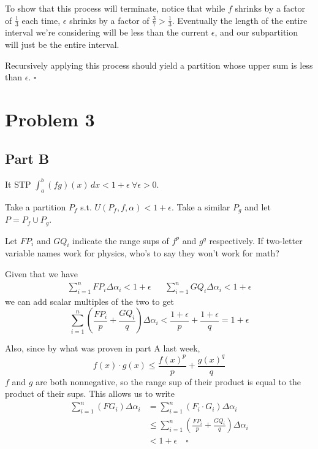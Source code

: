 \documentclass[12pt]{article}
\begin{document}
To show that this process will terminate, notice that while $f$ shrinks by a factor of $\frac{1}{3}$ each time,
$\epsilon$ shrinks by a factor of $\frac{3}{7} > \frac{1}{3}$.
Eventually the length of the entire interval we're considering will be less than the current $\epsilon$,
and our subpartition will just be the entire interval.

Recursively applying this process should yield a partition whose upper sum is less than $\epsilon$. $\square$

\pagebreak

\section{Problem 3}

\subsection{Part B}\label{sec:p3pb}

It STP $\int_{a}^{b} (fg)(x)\,dx < 1+\epsilon\ \forall \epsilon > 0$.

Take a partition $P_f$ s.t. $U(P_f, f, \alpha) < 1+\epsilon$.
Take a similar $P_g$ and let $P=P_f \cup P_g$.

Let $FP_i$ and $GQ_i$ indicate the range sups of $f^p$ and $g^q$ respectively.
If two-letter variable names work for physics, who's to say they won't work for math?

Given that we have
\begin{align*}
  \sum_{i=1}^{n} FP_i \Delta \alpha_i < 1+\epsilon &  &
  \sum_{i=1}^{n} GQ_i \Delta \alpha_i < 1+\epsilon
\end{align*}
we can add scalar multiples of the two to get
\[\sum_{i=1}^{n} \left(\frac{FP_i}{p}+\frac{GQ_i}{q}\right)\Delta\alpha_i < \frac{1+\epsilon}{p}+\frac{1+\epsilon}{q}=1+\epsilon\]

Also, since by what was proven in part A last week,
\[f(x) \cdot g(x) \le \frac{f(x)^p}{p}+\frac{g(x)^q}{q}\]
$f$ and $g$ are both nonnegative, so the range sup of their product is
equal to the product of their sups.
This allows us to write
\begin{align*}
  \sum_{i=1}^{n} (FG_i) \Delta\alpha_i
  &=  \sum_{i=1}^{n} (F_i \cdot G_i) \Delta\alpha_i \\
  &\le\sum_{i=1}^{n} \left(\frac{FP_i}{p}+\frac{GQ_i}{q}\right)\Delta\alpha_i  \\
  &< 1+\epsilon\quad\square
\end{align*}
\end{document}
